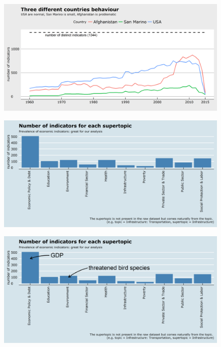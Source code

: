 \documentclass[9pt]{beamer}
\begin{document}
\begin{frame}
\begin{figure}
\centering
\includegraphics[width=\textwidth]{plot0002.png}
\end{figure}
\end{frame}

\begin{frame}
\begin{figure}
\centering
\includegraphics[width=\textwidth]{plot0003.png}
\end{figure}
\end{frame}

\begin{frame}
\begin{figure}
\centering
\includegraphics[width=\textwidth]{plot0004.png}
\end{figure}
\end{frame}
\end{document}
